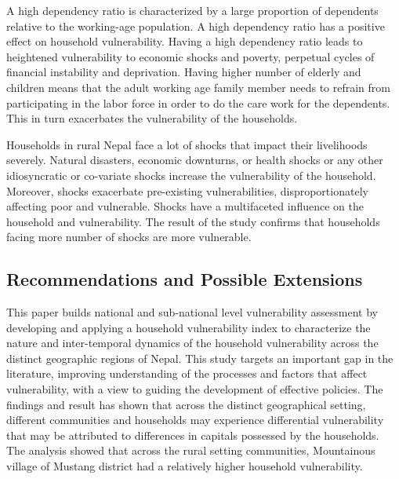 A high dependency ratio is characterized by a large proportion of dependents relative to the working-age population. A high dependency ratio has a positive effect on household vulnerability. Having a high dependency ratio leads to heightened vulnerability to economic shocks and poverty, perpetual cycles of financial instability and deprivation. Having higher number of elderly and children means that the adult working age family member needs to refrain from participating in the labor force in order to do the care work for the dependents. This in turn exacerbates the vulnerability of the households. 

Households in rural Nepal face a lot of shocks that impact their livelihoods severely. Natural disasters, economic downturns, or health shocks or any other idiosyncratic or co-variate shocks increase the vulnerability of the household. Moreover, shocks exacerbate pre-existing vulnerabilities, disproportionately affecting poor and vulnerable. Shocks have a multifaceted influence on the household and vulnerability. The result of the study confirms that households facing more number of shocks are more vulnerable. 

\subsection{Recommendations and Possible Extensions}
This paper builds national and sub-national level vulnerability assessment \cite{antwi2013characterising, aksha2019analysis, shahiestimating} by developing and applying a household vulnerability index to characterize the nature and inter-temporal dynamics of the household vulnerability across the distinct geographic regions of Nepal. This study targets an important gap in the literature, improving understanding of the processes and factors that affect vulnerability, with a view to guiding the development of effective policies. The findings and result has shown that across the distinct geographical setting, different communities and households may experience differential vulnerability that may be attributed to differences in capitals possessed by the households. The analysis showed that across the rural setting communities, Mountainous village of Mustang district had a relatively higher household vulnerability. 

